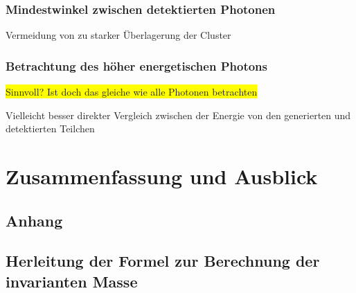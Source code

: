 \documentclass[a4paper,11pt,oneside,final,german,openbib,pdftex]{scrbook}
\begin{document}
{%

\subsection{Mindestwinkel zwischen detektierten Photonen}
Vermeidung von zu starker Überlagerung der Cluster

\subsection{Betrachtung des höher energetischen Photons}

\colorbox{yellow}{Sinnvoll? Ist doch das gleiche wie alle Photonen betrachten}

Vielleicht besser direkter Vergleich zwischen der Energie von den generierten und detektierten Teilchen
\chapter{Zusammenfassung und Ausblick}


\begin{appendix}
\chapter{Anhang}
\section{Herleitung der Formel zur Berechnung der invarianten Masse}
\label{sec:Herleitung-der-Formel-zur-Berechnung-der-invarianten-Masse}


\end{appendix}}
\end{document}
